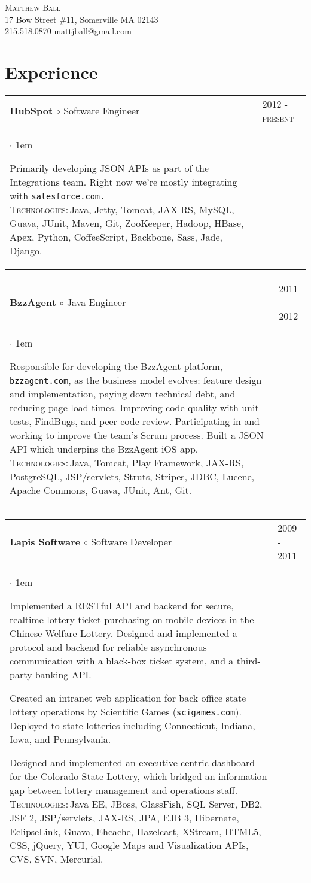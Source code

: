 \documentclass[10pt]{article}
\makeatletter
\newcommand{\employer}[4]
	{{ \begin{tabular}{l@{\hspace{5mm}}|p{30mm}}
	   \multicolumn{1}{l}{\textbf{#1 $\circ$ }#2}&\multicolumn{1}{p{30mm}}{\hspace{-3mm}\textsc{#3}} \\
	   \parbox{.825\textwidth}{#4 \vspace*{-4pt}}
	   \end{tabular} \vspace{4pt} }}
\newcommand{\contact}[4]
	{\begin{center}
		{\LARGE \scshape{#1}}\\
		#2\\
		\Telefon \hspace{0.5ex} #3 \hspace{1em} \Letter \hspace{0.5ex} #4
	\end{center}
	\vspace*{-8pt}}
\newenvironment{achievements}           %
	{\begin{list}{$\cdot$}{\topsep 0pt \itemsep 4pt \parsep 0pt \leftmargin 1em}
	 \linespread{1.05} \selectfont %
	}
	{\end{list}\vspace*{4pt}}
\def\kt{\vspace*{2pt}\\\textsc{Technologies:\,}}
\makeatother
\begin{document}
\contact{Matthew Ball}
{17 Bow Street \#11, Somerville MA 02143}
{215.518.0870}
{mattjball@gmail.com}

\section{Experience}
\employer{HubSpot}{Software Engineer}{2012 - present}{
	\begin{achievements}
	
	\item{Primarily developing JSON APIs as part of the Integrations team. Right now we're mostly integrating with \texttt{salesforce.com.} \kt Java, Jetty, Tomcat, JAX-RS, MySQL, Guava, JUnit, Maven, Git, ZooKeeper, Hadoop, HBase, Apex, Python, CoffeeScript, Backbone, Sass, Jade, Django. }
	
	\end{achievements}
}

\employer{BzzAgent}{Java Engineer}{2011 - 2012}{
	\begin{achievements}
	
	\item{Responsible for developing the BzzAgent platform, \texttt{bzzagent.com}, as the business model evolves: feature design and implementation, paying down technical debt, and reducing page load times. Improving code quality with unit tests, FindBugs, and peer code review. Participating in and working to improve the team's Scrum process. Built a JSON API which underpins the BzzAgent iOS app. \kt Java, Tomcat, Play Framework, JAX-RS, PostgreSQL, JSP/servlets, Struts, Stripes, JDBC, Lucene, Apache Commons, Guava, JUnit, Ant, Git.}
	
	\end{achievements}
}

\employer{Lapis Software}{Software Developer}{2009 - 2011}{
	\begin{achievements}
	
	\item{Implemented a RESTful API and backend for secure, realtime lottery ticket purchasing on mobile devices in the Chinese Welfare Lottery. Designed and implemented a protocol and backend for reliable asynchronous communication with a black-box ticket system, and a third-party banking API.}
	
\item{Created an intranet web application for back office state lottery operations by Scientific Games (\texttt{scigames.com}). Deployed to state lotteries including Connecticut, Indiana, Iowa, and Pennsylvania.}
	
\item{Designed and implemented an executive-centric dashboard for the Colorado State Lottery, which bridged an information gap between lottery management and operations staff. \kt Java EE, JBoss, GlassFish, SQL Server, DB2, JSF 2, JSP/servlets, JAX-RS, JPA, EJB 3, Hibernate, EclipseLink, Guava, Ehcache, Hazelcast, XStream, HTML5, CSS, jQuery, YUI, Google Maps and Visualization APIs, CVS, SVN, Mercurial.}
	
	\end{achievements}
}
\end{document}
